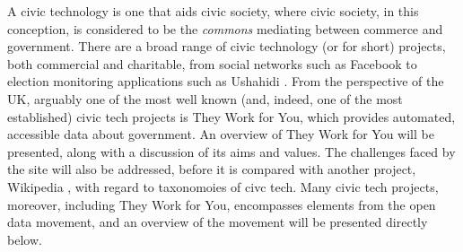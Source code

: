 A civic technology is one that aids civic society, where civic society, in this conception, is considered to be the \emph{commons} mediating between commerce and government.
There are a broad range of civic technology (or  for short) projects, both commercial and charitable, from social networks such as Facebook \cite{facebook} to election monitoring applications such as Ushahidi \cite{ushahidi}. 
From the perspective of the UK, arguably one of the most well known (and, indeed, one of the most established) civic tech projects is They Work for You, which provides automated, accessible data about government. 
An overview of They Work for You will be presented, along with a discussion of its aims and values. 
The challenges faced by the site will also be addressed, before it is compared with another project, Wikipedia \cite{wikipedia}, with regard to taxonomoies of civc tech.
Many civic tech projects, moreover, including They Work for You, encompasses elements from the open data movement,
and an overview of the movement will be presented directly below.